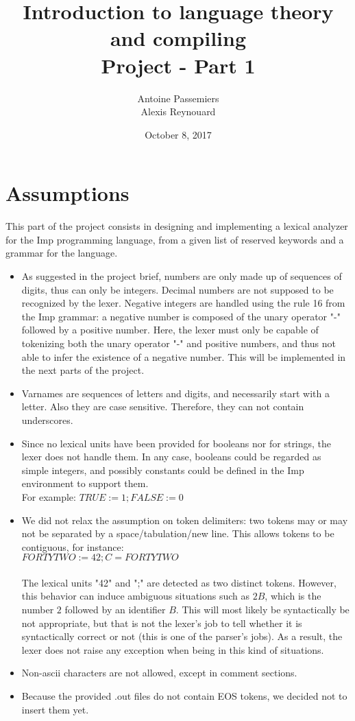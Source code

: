 \documentclass[12pt]{report}
\title{Introduction to language theory and compiling \\ Project - Part 1}
\author{Antoine Passemiers \\ Alexis Reynouard}
\date{October 8, 2017}
\begin{document}
\maketitle
\setcounter{tocdepth}{3}
\setcounter{secnumdepth}{3}
\setcounter{chapter}{0}
\tableofcontents
\pagebreak
\clearpage
\setcounter{page}{1}

\chapter{Assumptions}

This part of the project consists in designing and implementing a lexical analyzer for the Imp programming language, from a given list of reserved keywords 
and a grammar for the language.

\begin{itemize}
\item As suggested in the project brief, numbers are only made up of sequences of digits, thus can only be integers. Decimal numbers are not supposed
to be recognized by the lexer. Negative integers are handled using the rule 16 from the Imp grammar: a negative number is composed of the unary operator "-"
followed by a positive number. Here, the lexer must only be capable of tokenizing both the unary operator "-" and positive numbers, and thus not able to infer
the existence of a negative number. This will be implemented in the next parts of the project.
\item Varnames are sequences of letters and digits, and necessarily start with a letter. Also they are case sensitive. Therefore, they can not contain underscores.
\item Since no lexical units have been provided for booleans nor for strings, the lexer does not handle them. In any case, booleans could be regarded
as simple integers, and possibly constants could be defined in the Imp environment to support them. \\
For example: $TRUE := 1; FALSE := 0$
\item We did not relax the assumption on token delimiters: two tokens may or may not be separated by a space/tabulation/new line.
This allows tokens to be contiguous, for instance: \\ $FORTYTWO := 42; C = FORTYTWO$ \\ \\
The lexical units "42" and ";" are detected as two distinct tokens. However, this behavior can induce ambiguous situations such as $2B$, which is the number
$2$ followed by an identifier $B$. This will most likely be syntactically be not appropriate, but that is not the lexer's job to tell whether it is syntactically correct
or not (this is one of the parser's jobs). As a result, the lexer does not raise any exception when being in this kind of situations.
\item Non-ascii characters are not allowed, except in comment sections.
\item Because the provided .out files do not contain EOS tokens, we decided not to insert them yet.
\end{itemize}
\end{document}
